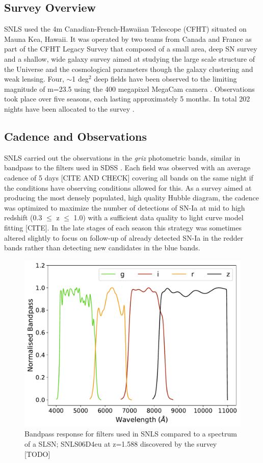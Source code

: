\subsection{Survey Overview}
SNLS used the 4m Canadian-French-Hawaiian Telescope (CFHT) situated on Mauna Kea, Hawaii. It was operated by two teams from Canada and France as part of the CFHT Legacy Survey that composed of a small area, deep SN survey and a shallow, wide galaxy survey aimed at studying the large scale structure of the Universe and the cosmological parameters though the galaxy clustering and weak lensing. Four, $\sim$1 deg$^2$ deep fields have been observed to the limiting magnitude of m=23.5 using the 400 megapixel MegaCam camera \citep{Boulade2003MegaCam:Camera}. Observations took place over five seasons, each lasting approximately 5 months. In total 202 nights have been allocated to the survey \citep{Pritchet2004SNLSSurvey}.

\subsection{Cadence and Observations}
SNLS carried out the observations in the \textit{griz} photometric bands, similar in bandpass to the filters used in SDSS . Each field was observed with an average cadence of 5 days [CITE AND CHECK] covering all bands on the same night if the conditions have observing conditions allowed for this. As a survey aimed at producing the most densely populated, high quality Hubble diagram, the cadence was optimized to maximize the number of detections of SN-Ia at mid to high redshift (0.3 $\leq$ z $\leq$ 1.0) with a sufficient data quality to light curve model fitting [CITE]. In the late stages of each season this strategy was sometimes altered slightly to focus on follow-up of already detected SN-Ia in the redder bands rather than detecting new candidates in the blue bands.

\begin{figure}
  \centering
  \includegraphics[scale=0.8]{Figures/Chapter2/SNLS_filters.pdf}
	\caption{Bandpass response for filters used in SNLS compared to a 				spectrum of a SLSN; SNLS06D4eu at z=1.588 discovered by the 			  survey [TODO]}
    \label{fig:SNLSFilters}
\end{figure}

